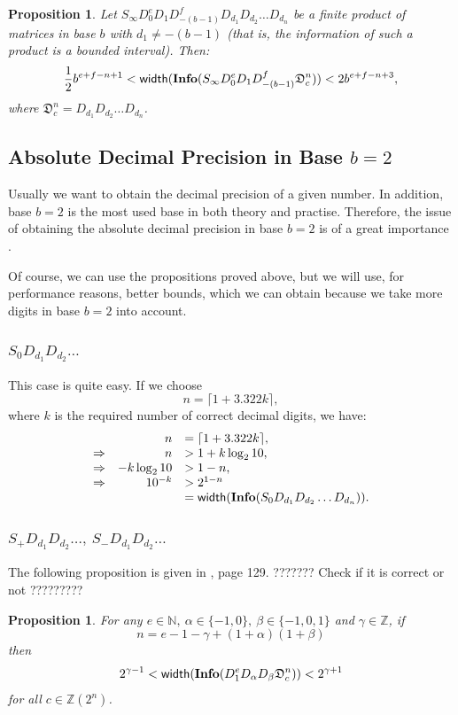 \documentclass[11pt,a4paper]{article}
\newtheorem{prop}[tm]{Proposition}
\begin{document}
	\begin{prop} \label{prop:Sinf and width of information with base b 2}
		Let $S_\infty D_0^e D_1 D_{-(b-1)}^f D_{d_1} D_{d_2} \ldots D_{d_n}$
		be a finite product of matrices in base $b$ with $d_1 \ne
		-(b-1)$ (that is, the information of such a product is a
		bounded interval). Then:
		\[ \frac{1}{2} b^{e+f-n+1} < {\sf width} ( {\bf Info} ( S_\infty
			D_0^e D_1 D_{-(b-1)}^f \mathfrak{D}_c^n ) ) < 2b^{e+f-n+3}, \]
		where $\mathfrak{D}_c^n = D_{d_1} D_{d_2} \ldots D_{d_n}$.
	\end{prop}


\subsection{Absolute Decimal Precision in Base $b=2$}
Usually we want to obtain the decimal precision of a given number.
	In addition, base $b=2$ is the most used base in both theory
	and practise. Therefore, the issue of obtaining the absolute decimal
	precision in base $b=2$ is of a great importance \cite{errhec00}.

Of course, we can use the propositions proved above, but we will use,
	for performance reasons, better bounds, which we can obtain
	because we take more digits in base $b=2$ into account.


\subsubsection{$S_0 D_{d_1} D_{d_2} \ldots$}
This case is quite easy. If we choose
	\begin{equation}
		n=\lceil 1 + 3.322 k \rceil,
	\end{equation}
	where $k$ is the required number of correct decimal digits, we have:
	\[ \begin{array}{lrl}
		& n & = \lceil 1 + 3.322 k \rceil, \\
		\Rightarrow & n & > 1 + k \log_2 10, \\
		\Rightarrow & -k \log_2 10 & > 1 - n, \\
		\Rightarrow & 10^{-k} & > 2^{1-n} \\
		&& = {\sf width} ( {\bf Info} (S_0 D_{d_1} D_{d_2} \ldots D_{d_n} ) ).
	\end{array} \]


\subsubsection{$S_+ D_{d_1} D_{d_2} \ldots,\ S_- D_{d_1} D_{d_2} \ldots$}
The following proposition is given in \cite{pot98}, page 129. ???????
	Check if it is correct or not ?????????
	\begin{prop} \label{prop:width of information with base 2}
		For any $e \in \mathbb{N},\ \alpha \in \{-1,0\},\ \beta \in
		\{-1,0,1\}$ and $\gamma \in \mathbb{Z}$, if
		\[ n = e - 1 - \gamma + (1+\alpha)(1+\beta) \]
		then
		\[ 2^{\gamma-1} < {\sf width} ( {\bf Info} (D_1^e D_\alpha
			D_\beta \mathfrak{D}_c^n )) < 2^{\gamma+1} \]
		for all $c \in \mathbb{Z}(2^n)$.
	\end{prop}
\end{document}
